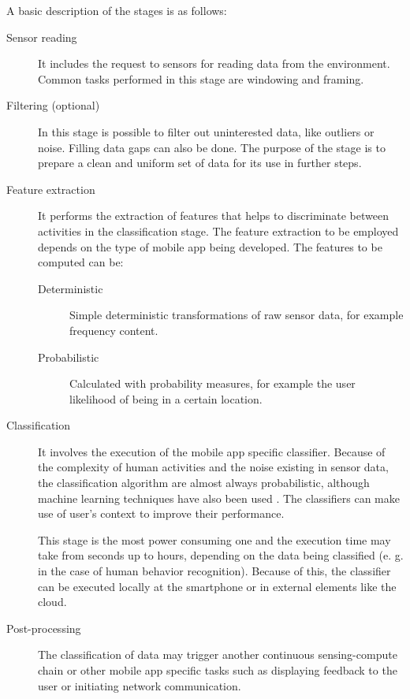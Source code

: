 A basic description of the stages is as follows:
\begin{description}
  \item[Sensor reading] It includes the request to sensors for reading data from the environment. 
  Common tasks performed in this stage are windowing and framing.

  \item[Filtering (optional)] In this stage is possible to filter out uninterested data, like outliers or noise.
  Filling data gaps can also be done.
  The purpose of the stage is to prepare a clean and uniform set of data for its use in further steps.

  \item[Feature extraction] It performs the extraction of features that helps to discriminate between activities in the classification stage.
  The feature extraction to be employed depends on the type of mobile app being developed.
  The features to be computed can be:
  \begin{description}
    \item[Deterministic] Simple deterministic transformations of raw sensor data, for example frequency content.
    \item[Probabilistic] Calculated with probability measures, for example the user likelihood of being in a certain location.
  \end{description}

  \item[Classification] It involves the execution of the mobile app specific classifier.
  Because of the complexity of human activities and the noise existing in sensor data, the classification algorithm are almost always probabilistic, although machine learning techniques have also been used \cite{Choudhury2008}.
  The classifiers can make use of user’s context to improve their performance.

  This stage is the most power consuming one and the execution time may take from seconds up to hours, depending on the data being classified (e. g. in the case of human behavior recognition).
  Because of this, the classifier can be executed locally at the smartphone or in external elements like the cloud.

  \item[Post-processing] The classification of data may trigger another continuous sensing-compute chain or other mobile app specific tasks such as displaying feedback to the user or initiating network communication.

\end{description}

